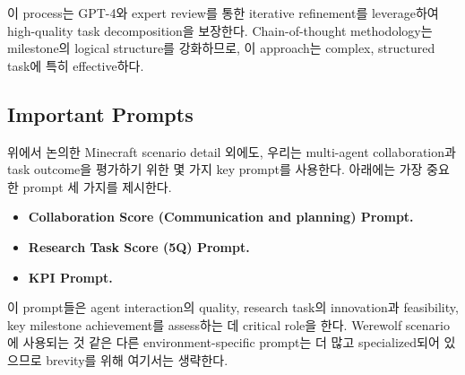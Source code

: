 이 process는 GPT-4와 expert review를 통한 iterative refinement를 leverage하여 high-quality task decomposition을 보장한다. Chain-of-thought methodology는 milestone의 logical structure를 강화하므로, 이 approach는 complex, structured task에 특히 effective하다.




\subsection{Important Prompts}
\label{sec:important-prompts}

위에서 논의한 Minecraft scenario detail 외에도, 우리는 multi-agent collaboration과 task outcome을 평가하기 위한 몇 가지 key prompt를 사용한다. 아래에는 가장 중요한 prompt 세 가지를 제시한다.

\begin{itemize}
    \item \textbf{Collaboration Score (Communication and planning) Prompt.}
    \item \textbf{Research Task Score (5Q) Prompt.}
    \item \textbf{KPI Prompt.}
\end{itemize}

이 prompt들은 agent interaction의 quality, research task의 innovation과 feasibility, key milestone achievement를 assess하는 데 critical role을 한다. Werewolf scenario에 사용되는 것 같은 다른 environment-specific prompt는 더 많고 specialized되어 있으므로 brevity를 위해 여기서는 생략한다.


